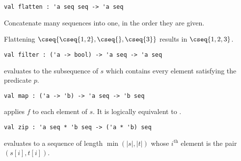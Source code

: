 \begin{flex}
\label{grp:grm:seq-interface::flatten}

\begin{gram}[flatten]
\label{grm:seq-interface::flatten}
\begin{verbatim}
val flatten : 'a seq seq -> 'a seq
\end{verbatim}
Concatenate many sequences into one, in the order they are given.

\end{gram}

\begin{example}
\label{xmpl:seq-interface::flattening}
Flattening $\cseq{\cseq{1,2},\cseq{},\cseq{3}}$ results in $\cseq{1,2,3}$.

\end{example}
\end{flex}

\begin{cluster}
\label{grp:gr:filter}

\begin{gram}[filter]
\label{gr:filter}
\begin{verbatim}
val filter : ('a -> bool) -> 'a seq -> 'a seq
\end{verbatim}
 evaluates to the subsequence of $s$ which contains every
element satisfying the predicate $p$.

\end{gram}
\end{cluster}

\begin{cluster}
\label{grp:gr:map}

\begin{gram}[map]
\label{gr:map}
\begin{verbatim}
val map : ('a -> 'b) -> 'a seq -> 'b seq
\end{verbatim}
 applies $f$ to each element of $s$. It is logically equivalent
to .

\end{gram}
\end{cluster}

\begin{cluster}
\label{grp:gr:zip}

\begin{gram}[zip]
\label{gr:zip}
\begin{verbatim}
val zip : 'a seq * 'b seq -> ('a * 'b) seq
\end{verbatim}
 evaluates to a sequence of length $\min(|s|,|t|)$ whose $i^\text{th}$
element is the pair $(s[i], t[i])$.

\end{gram}
\end{cluster}

